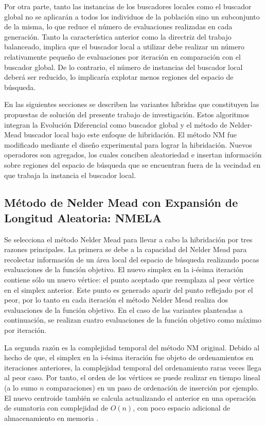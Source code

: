 Por otra parte, tanto las instancias de los buscadores locales como el buscador global no se aplicarán a todos los individuos de la población sino un subconjunto de la misma, lo que reduce el número de evaluaciones realizadas en cada generación. Tanto la característica anterior como la directriz del trabajo balanceado, implica que el buscador local a utilizar debe realizar un número relativamente pequeño de evaluaciones por iteración en comparación con el buscador global. De lo contrario, el número de instancias del buscador local deberá ser reducido, lo implicaría explotar menos regiones del espacio de búsqueda. 

En las siguientes secciones se describen las variantes híbridas que constituyen las propuestas de solución del presente trabajo de investigación. Estos algoritmos integran la Evolución Diferencial como buscador global y el método de Nelder-Mead buscador local bajo este enfoque de hibridación. El método NM fue modificado mediante el diseño experimental para lograr la hibridación. Nuevos operadores son agregados, los cuales conciben aleatoriedad e insertan información sobre regiones del espacio de búsqueda que se encuentran fuera de la vecindad en que trabaja la instancia el buscador local.

\subsection{Método de Nelder Mead con Expansión de Longitud Aleatoria: NMELA} \label{sec:NMELA}
Se selecciona el método Nelder Mead para llevar a cabo la hibridación por tres razones principales. La primera se debe a la capacidad del Nelder Mead para recolectar información de un área local del espacio de búsqueda realizando pocas evaluaciones de la función objetivo. El nuevo simplex en la i-ésima iteración contiene sólo un nuevo vértice: el punto aceptado que reemplaza al peor vértice en el simplex anterior. Este punto es generado aparir del punto reflejado por el peor, por lo tanto en cada iteración el método Nelder Mead realiza dos evaluaciones de la función objetivo. En el caso de las variantes planteadas a continuación, se realizan cuatro evaluaciones de la función objetivo como máximo por iteración. 

La segunda razón es la complejidad temporal del método NM original. Debido al hecho de que, el simplex en la  i-ésima iteración fue objeto de ordenamientos en iteraciones anteriores, la complejidad temporal del ordenamiento raras veces llega al peor caso. Por tanto, el orden de los vértices se puede realizar en tiempo lineal (a lo sumo $n$ comparaciones) en un paso de ordenación de inserción por ejemplo. El nuevo centroide también se calcula actualizando el anterior en una operación de sumatoria con complejidad de $O(n)$, con poco espacio  adicional de almacenamiento en memoria \cite{Singer2018}. 

